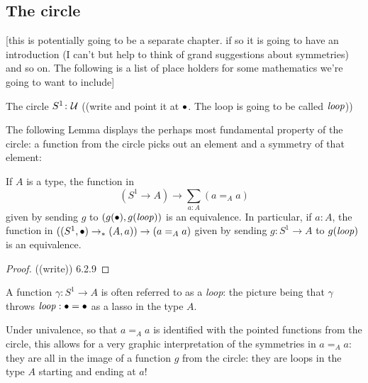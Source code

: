 \begin{definition}






\section{The circle}
\label{sec:sec:circle}
[this is potentially going to be a separate chapter.  if so it is going to have an introduction (I can't but help to think of grand suggestions about symmetries) and so on.  The following is a list of place holders for some mathematics we're going to want to include]

\begin{definition}
  \label{def:circle}
The circle $S^1\colon\mathcal{U}$ ((write and point it at $\bullet$.  The loop is going to be called $\mathit{loop}$))
\end{definition}
The following Lemma displays the perhaps most fundamental property of the circle: a function from the circle picks out an element and a symmetry of that element:
\begin{lemma}\label{lem:freeloopspace}
  If $A$ is a type, the function in $$(S^1\to A)\to \sum_{a:A}(a=_Aa)$$
given by sending $g$ to $(g(\bullet),g(\mathit{loop}))$ is an equivalence.  In particular, if $a:A$, the function in $((S^1,\bullet)\to_* (A,a))\to (a=_Aa)$ given by sending $g:S^1\to A$ to $g(\mathit{loop})$ is an equivalence. 
\end{lemma}
\begin{proof}
  ((write)) 6.2.9
\end{proof}
\begin{remark}
  A function $\gamma:S^1\to A$ is often referred to as a \emph{loop}: the picture being that $\gamma$ throws $\mathit{loop}:\bullet=\bullet$ as a lasso in the type $A$.

  Under univalence, so that $a=_Aa$ is identified with the pointed functions from the circle, this allows for a very graphic interpretation of the symmetries in $a=_Aa$: they are all in the image of a function $g$ from the circle: they are loops in the type $A$ starting and ending at $a$!
\end{remark}




\end{definition}
